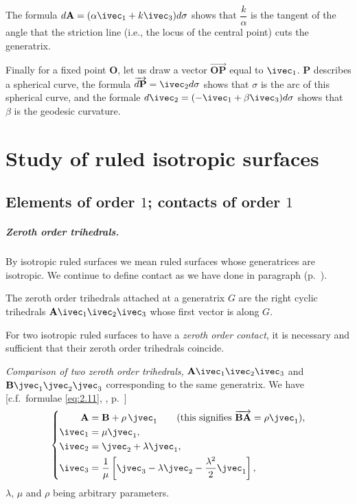 The formula $d\mathbf{A}=(\alpha\ivec_{1}+k\ivec_{3})d\sigma$ shows that $\dfrac{k}{\alpha}$ is the tangent of the angle that the striction line (i.e., the locus of the central point) cuts the generatrix.

Finally for a fixed point $\mathbf{O}$, let us draw a vector $\overrightarrow{\mathbf{OP}}$ equal to $\ivec_{1}$. $\mathbf{P}$ describes a spherical curve, the formula $\overrightarrow{d\mathbf{P}}=\ivec_{2}d\sigma$ shows that $\sigma$ is the arc of this spherical curve, and the formale $d\ivec_{2}=(-\ivec_{1}+\beta\ivec_{3})d\sigma$ shows that $\beta$ is the geodesic curvature.


\chapter{Study of ruled isotropic surfaces}
\label{cha:study-ruled-isotr}

\section{Elements of order $1$; contacts of order $1$}
\label{sec:elements-order-1}

\paragraph{Zeroth order trihedrals.}
\label{sec:49}
By isotropic ruled surfaces we mean ruled surfaces whose generatrices are isotropic. We continue to define contact as we have done in paragraph  (p.~\pageref{sec:43}).

The zeroth order trihedrals attached at a generatrix $G$ are the right cyclic trihedrals $\mathbf{A}\ivec_{1}\ivec_{2}\ivec_{3}$ whose first vector is along $G$.

For two isotropic ruled surfaces to have a \emph{zeroth order contact}, it is necessary and sufficient that their zeroth order trihedrals coincide.

\somespace

\emph{Comparison of two zeroth order trihedrals,} $\mathbf{A}\ivec_{1}\ivec_{2}\ivec_{3}$ and $\mathbf{B}\jvec_{1}\jvec_{2}\jvec_{3}$ corresponding to the same generatrix. We have [c.f.~formulae \eqref{eq:2.11}, , p.~\pageref{sec:27}]
\begin{equation}
  \label{eq:4.1}
  \left\{
    \begin{aligned}
      \mathbf{A}&=\mathbf{B}+\rho\,\jvec_{1}\qquad\text{(this signifies $\overrightarrow{\mathbf{BA}}=\rho\jvec_{1}$)},\\
      \ivec_{1}&=\mu\jvec_{1},\\
      \ivec_{2}&=\jvec_{2}+\lambda\jvec_{1},\\
      \ivec_{3}&=\frac{1}{\mu}\left[\jvec_{3}-\lambda\jvec_{2}-\frac{\lambda^{2}}{2}\jvec_{1}\right],
    \end{aligned}
  \right.
\end{equation}
$\lambda$, $\mu$ and $\rho$ being arbitrary parameters.

